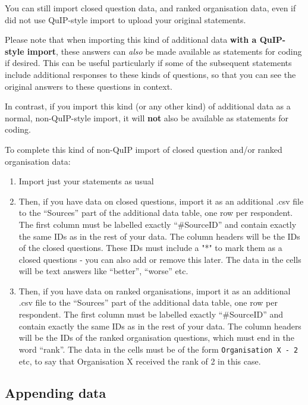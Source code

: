 \documentclass[
]{book}
\providecommand{\tightlist}{%
  \setlength{\itemsep}{0pt}\setlength{\parskip}{0pt}}
\begin{document}
You can still import closed question data, and ranked organisation data, even if did not use QuIP-style import to upload your original statements.

Please note that when importing this kind of additional data \textbf{with a QuIP-style import}, these answers can \emph{also} be made available as statements for coding if desired. This can be useful particularly if some of the subsequent statements include additional responses to these kinds of questions, so that you can see the original answers to these questions in context.

In contrast, if you import this kind (or any other kind) of additional data as a normal, non-QuIP-style import, it will \textbf{not} also be available as statements for coding.

To complete this kind of non-QuIP import of closed question and/or ranked organisation data:

\begin{enumerate}
\def\labelenumi{\arabic{enumi})}
\tightlist
\item
  Import just your statements as usual
\item
  Then, if you have data on closed questions, import it as an additional .csv file to the ``Sources'' part of the additional data table, one row per respondent. The first column must be labelled exactly ``\#SourceID'' and contain exactly the same IDs as in the rest of your data. The column headers will be the IDs of the closed questions. These IDs must include a "*" to mark them as a closed questions - you can also add or remove this later. The data in the cells will be text answers like ``better'', ``worse'' etc.
\item
  Then, if you have data on ranked organisations, import it as an additional .csv file to the ``Sources'' part of the additional data table, one row per respondent. The first column must be labelled exactly ``\#SourceID'' and contain exactly the same IDs as in the rest of your data. The column headers will be the IDs of the ranked organisation questions, which must end in the word ``rank''. The data in the cells must be of the form \texttt{Organisation\ X\ -\ 2} etc, to say that Organisation X received the rank of 2 in this case.
\end{enumerate}

\hypertarget{appending-data}{%
\subsection{Appending data}\label{appending-data}}
\end{document}
